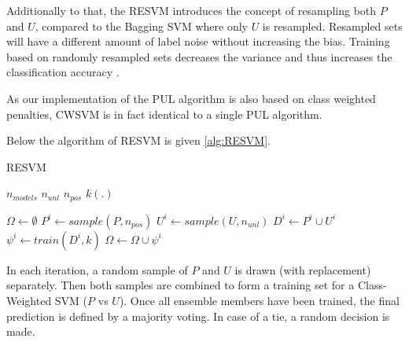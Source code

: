 Additionally to that, the RESVM introduces the concept of resampling both \(P\) and \(U\), compared to the Bagging SVM where only \(U\) is resampled. Resampled sets will have a different amount of label noise without increasing the bias. Training based on randomly resampled sets decreases the variance and thus increases the classification accuracy \cite{journals/ml/Breiman00}.

As our implementation of the PUL algorithm is also based on class weighted penalties, CWSVM is in fact identical to a single PUL algorithm.

Below the algorithm of RESVM is given \ref{alg:RESVM}.

\begin{algorithm}[h!]                      
\caption{RESVM} 
\label{alg:RESVM}
\begin{algorithmic}[0]
        \State $ n_{models}  $ 
         \State $ n_{unl}  $ 
        \State $ n_{pos}  $  
        \State $ k(.)  $  
        
\end{algorithmic}
    \begin{algorithmic}[1]
       \State $\Omega    \gets \emptyset$  
            \State $P^i \gets sample(P,n_{pos}) $ 
            \State $U^i \gets sample(U,n_{unl}) $ 
            \State $ D^i \gets  P^i \cup U^i$ 
            \State $\psi^i \gets train(D^i,k) $ 
            \State $\Omega \gets \Omega \cup \psi^i $ 
   \end{algorithmic}
\end{algorithm}

In each iteration, a random sample of \(P\) and \(U\) is drawn (with replacement) separately. Then both samples are combined to form a training set for a Class-Weighted SVM (\(P\) vs \(U\)). Once all ensemble members have been trained, the final prediction is defined by a majority voting. In case of a tie, a random decision is made.


